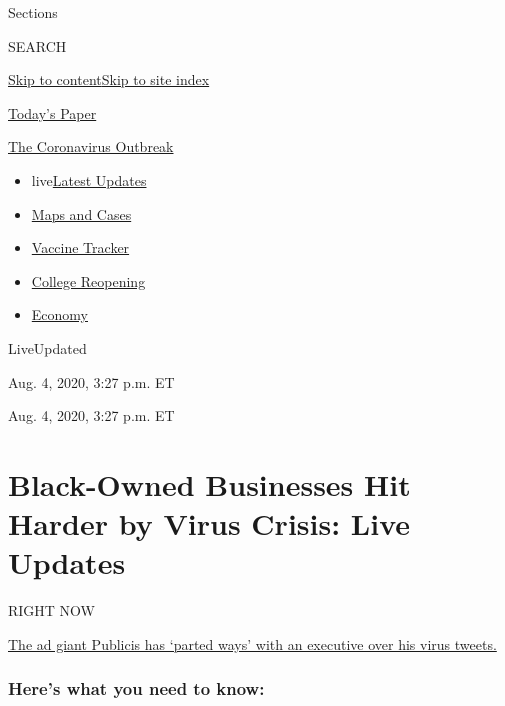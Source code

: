 Sections

SEARCH

\protect\hyperlink{site-content}{Skip to
content}\protect\hyperlink{site-index}{Skip to site index}

\href{https://myaccount.nytimes.com/auth/login?response_type=cookie\&client_id=vi}{}

\href{https://www.nytimes.com/section/todayspaper}{Today's Paper}

\href{https://www.nytimes.com/news-event/coronavirus}{The Coronavirus
Outbreak}

\begin{itemize}
\tightlist
\item
  live\href{https://www.nytimes.com/2020/08/04/world/coronavirus-cases.html}{Latest
  Updates}
\item
  \href{https://www.nytimes.com/interactive/2020/us/coronavirus-us-cases.html}{Maps
  and Cases}
\item
  \href{https://www.nytimes.com/interactive/2020/science/coronavirus-vaccine-tracker.html}{Vaccine
  Tracker}
\item
  \href{https://www.nytimes.com/2020/08/02/us/covid-college-reopening.html}{College
  Reopening}
\item
  \href{https://www.nytimes.com/live/2020/08/04/business/stock-market-today-coronavirus}{Economy}
\end{itemize}

LiveUpdated~

Aug. 4, 2020, 3:27 p.m. ET

Aug. 4, 2020, 3:27 p.m. ET

\hypertarget{black-owned-businesses-hit-harder-by-virus-crisis-live-updates}{%
\section{Black-Owned Businesses Hit Harder by Virus Crisis: Live
Updates}\label{black-owned-businesses-hit-harder-by-virus-crisis-live-updates}}

RIGHT NOW

\protect\hyperlink{the-ad-giant-publicis-has-parted-ways-with-an-executive-over-his-virus-tweets}{The
ad giant Publicis has `parted ways' with an executive over his virus
tweets.}

\hypertarget{heres-what-you-need-to-know}{%
\subsubsection{Here's what you need to
know:}\label{heres-what-you-need-to-know}}

